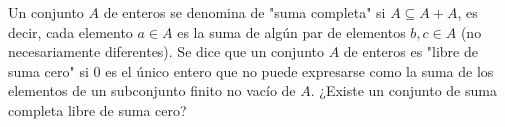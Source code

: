 Un conjunto $A$ de enteros se denomina de "suma completa" si $A \subseteq A + A$, es decir, cada elemento $a \in A$ es la suma de algún par de elementos $b,c \in A$ (no necesariamente diferentes). Se dice que un conjunto $A$ de enteros es "libre de suma cero" si $0$ es el único entero que no puede expresarse como la suma de los elementos de un subconjunto finito no vacío de $A$.
¿Existe un conjunto de suma completa libre de suma cero?
